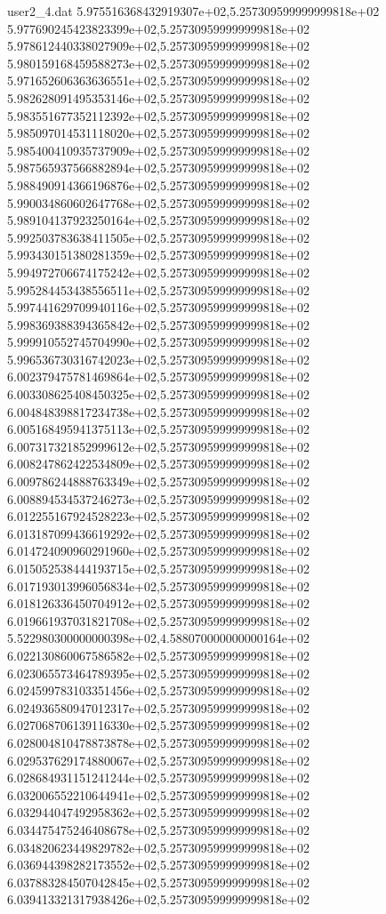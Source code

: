 \begin{filecontents}{user2_4.dat}
5.975516368432919307e+02,5.257309599999999818e+02
5.977690245423823399e+02,5.257309599999999818e+02
5.978612440338027909e+02,5.257309599999999818e+02
5.980159168459588273e+02,5.257309599999999818e+02
5.971652606363636551e+02,5.257309599999999818e+02
5.982628091495353146e+02,5.257309599999999818e+02
5.983551677352112392e+02,5.257309599999999818e+02
5.985097014531118020e+02,5.257309599999999818e+02
5.985400410935737909e+02,5.257309599999999818e+02
5.987565937566882894e+02,5.257309599999999818e+02
5.988490914366196876e+02,5.257309599999999818e+02
5.990034860602647768e+02,5.257309599999999818e+02
5.989104137923250164e+02,5.257309599999999818e+02
5.992503783638411505e+02,5.257309599999999818e+02
5.993430151380281359e+02,5.257309599999999818e+02
5.994972706674175242e+02,5.257309599999999818e+02
5.995284453438556511e+02,5.257309599999999818e+02
5.997441629709940116e+02,5.257309599999999818e+02
5.998369388394365842e+02,5.257309599999999818e+02
5.999910552745704990e+02,5.257309599999999818e+02
5.996536730316742023e+02,5.257309599999999818e+02
6.002379475781469864e+02,5.257309599999999818e+02
6.003308625408450325e+02,5.257309599999999818e+02
6.004848398817234738e+02,5.257309599999999818e+02
6.005168495941375113e+02,5.257309599999999818e+02
6.007317321852999612e+02,5.257309599999999818e+02
6.008247862422534809e+02,5.257309599999999818e+02
6.009786244888763349e+02,5.257309599999999818e+02
6.008894534537246273e+02,5.257309599999999818e+02
6.012255167924528223e+02,5.257309599999999818e+02
6.013187099436619292e+02,5.257309599999999818e+02
6.014724090960291960e+02,5.257309599999999818e+02
6.015052538444193715e+02,5.257309599999999818e+02
6.017193013996056834e+02,5.257309599999999818e+02
6.018126336450704912e+02,5.257309599999999818e+02
6.019661937031821708e+02,5.257309599999999818e+02
5.522980300000000398e+02,4.588070000000000164e+02
6.022130860067586582e+02,5.257309599999999818e+02
6.023065573464789395e+02,5.257309599999999818e+02
6.024599783103351456e+02,5.257309599999999818e+02
6.024936580947012317e+02,5.257309599999999818e+02
6.027068706139116330e+02,5.257309599999999818e+02
6.028004810478873878e+02,5.257309599999999818e+02
6.029537629174880067e+02,5.257309599999999818e+02
6.028684931151241244e+02,5.257309599999999818e+02
6.032006552210644941e+02,5.257309599999999818e+02
6.032944047492958362e+02,5.257309599999999818e+02
6.034475475246408678e+02,5.257309599999999818e+02
6.034820623449829782e+02,5.257309599999999818e+02
6.036944398282173552e+02,5.257309599999999818e+02
6.037883284507042845e+02,5.257309599999999818e+02
6.039413321317938426e+02,5.257309599999999818e+02

\end{filecontents}
